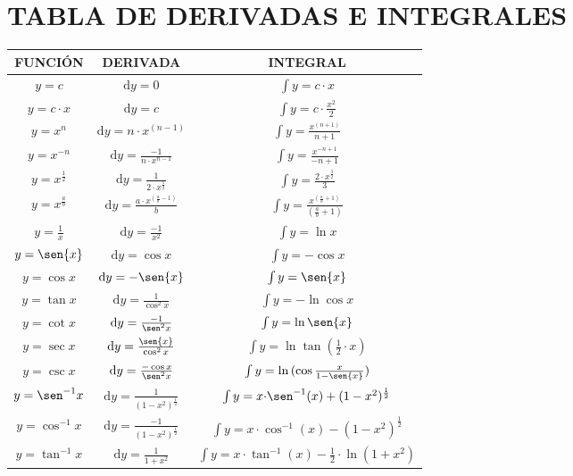 \documentclass[11pt,twoside,a4paper]{article}
\begin{document}
\section*{TABLA DE DERIVADAS E INTEGRALES}
\begin{tabular}{|c|c|c|}
\hline
\textbf{FUNCIÓN} & \textbf{DERIVADA} & \textbf{INTEGRAL}\\
\hline
$y = c$ & $\mathrm{d}y = 0$ & $\int{y} = c{\cdot}x$\\
\hline
$y = c{\cdot}x$ & $\mathrm{d}y = c$ & $\int{y} = c{\cdot}\frac{x^2}{2}$\\
\hline
$y = x^n$ & $\mathrm{d}y = n{\cdot}x^{(n-1)}$ & $\int{y} = \frac{x^{(n+1)}}{n+1}$\\
\hline
$y = x^{-n}$ & $\mathrm{d}y = \frac{-1}{n{\cdot}x^{n-1}}$ & $\int{y} = \frac{x^{-n+1}}{-n+1}$\\
\hline
$y = x^{\frac{1}{2}}$ & $\mathrm{d}y = \frac{1}{2{\cdot}x^{\frac{1}{2}}}$ & $\int{y} = \frac{2{\cdot}x^{\frac{3}{2}}}{3}$\\
\hline
$y = x^{\frac{a}{b}}$ & $\mathrm{d}y = \frac{a{\cdot}x^{(\frac{a}{b}-1)}}{b}$ & $\int{y} = \frac{x^{(\frac{a}{b}+1)}}{(\frac{a}{b}+1)}$\\
\hline
$y = \frac{1}{x}$ & $\mathrm{d}y = \frac{-1}{x^2}$ & $\int{y} = \ln{x}$\\
\hline
$y = \sen{x}$ & $\mathrm{d}y = \cos{x}$ & $\int{y} = -\cos{x}$\\
\hline
$y = \cos{x}$ & $\mathrm{d}y = -\sen{x}$ & $\int{y} = \sen{x}$\\
\hline
$y = \tan{x}$ & $\mathrm{d}y = \frac{1}{\cos^2{x}}$ & $\int{y} = -\ln{\cos{x}}$\\
\hline
$y = \cot{x}$ & $\mathrm{d}y = \frac{-1}{\sen^2{x}}$ & $\int{y} = \ln{\sen{x}}$\\
\hline
$y = \sec{x}$ & $\mathrm{d}y = \frac{\sen{x}}{\cos^2{x}}$ & $\int{y} = \ln{\tan{(\frac{1}{2}{\cdot}x)}}$\\
\hline
$y = \csc{x}$ & $\mathrm{d}y = \frac{-\cos{x}}{\sen^2{x}}$ & $\int{y} = \ln{(\cos{\frac{x}{1-\sen{x}}})}$\\
\hline
$y = \sen^{-1}{x}$ & $\mathrm{d}y = \frac{1}{(1-x^2)^\frac{1}{2}}$ & $\int{y} = x{\cdot}\sen^{-1}{(x)} + (1-x^2)^\frac{1}{2}$\\
\hline
$y = \cos^{-1}{x}$ & $\mathrm{d}y = \frac{-1}{(1-x^2)^\frac{1}{2}}$ & $\int{y} = x{\cdot}\cos^{-1}{(x)} - (1-x^2)^\frac{1}{2}$\\
\hline
$y = \tan^{-1}{x}$ & $\mathrm{d}y = \frac{1}{1+x^2}$ & $\int{y} = x{\cdot}\tan^{-1}{(x)} - \frac{1}{2}{\cdot}\ln{(1+x^2)}$\\

\end{tabular}
\end{document}
